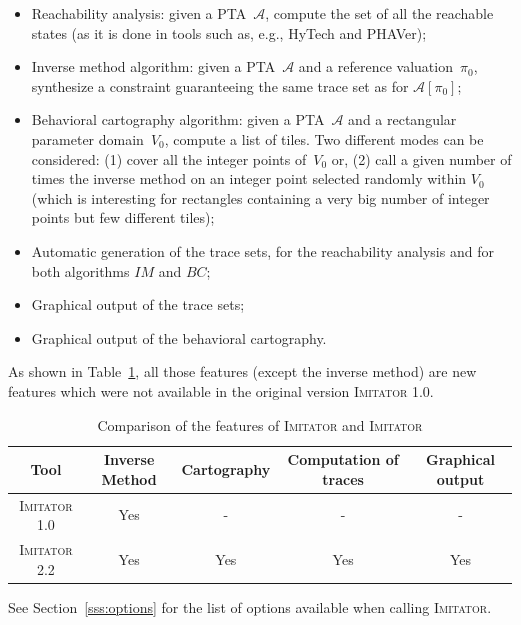\documentclass[a4paper,10pt]{article}
\newcommand{\A}{\mathcal{A}}
\newcommand{\IM}{\mathit{IM}}
\newcommand{\carto}{\mathit{BC}}
\newcommand{\hytech}{{\sc HyTech}}
\newcommand{\imitator}{\textsc{Imitator}}
\newcommand{\phaver}{PHAVer}
\newcommand{\imitatorversion}{2.2}
\begin{document}
\begin{itemize}
	\item Reachability analysis: given a PTA~$\A$, compute the set of all the reachable states (as it is done in tools such as, e.g., \hytech{} and \phaver{});
	\item Inverse method algorithm: given a PTA~$\A$ and a reference valuation~$\pi_0$, synthesize a constraint guaranteeing the same trace set as for $\A[\pi_0]$;
	\item Behavioral cartography algorithm: given a PTA~$\A$ and a rectangular parameter domain~$V_0$, compute a list of tiles. Two different modes can be considered: (1) cover all the integer points of~$V_0$ or, (2) call a given number of times the inverse method on an integer point selected randomly within $V_0$ (which is interesting for rectangles containing a very big number of integer points but few different tiles);
	\item Automatic generation of the trace sets, for the reachability analysis and for both algorithms $\IM$ and $\carto$;
	\item Graphical output of the trace sets;
        \item Graphical output of the behavioral cartography. 
\end{itemize}

As shown in Table~\ref{table:features}, all those features (except the inverse method) are new features which were not available in the original version \imitator{} 1.0.


\begin{table}[ht!]
{

\centering
\small

\begin{tabular}{| c || c | c | c | c |}
	\hline
	Tool & Inverse Method & Cartography & Computation of traces & Graphical output \\
	\hline
	\imitator{} 1.0 & Yes & - & - & - \\
	\hline
	\imitator{} \imitatorversion{} & Yes & Yes & Yes & Yes\\
	\hline
\end{tabular}

}
\caption{Comparison of the features of \imitator{} and \imitator{}}
\label{table:features}
\end{table}

See Section~\ref{sss:options} for the list of options available when calling \imitator{}.
\end{document}
